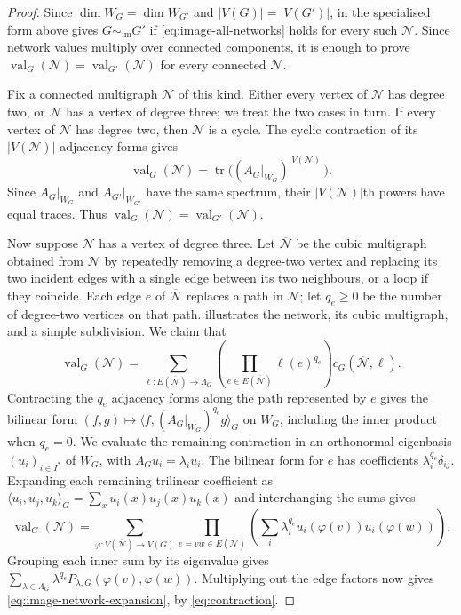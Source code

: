 \documentclass[11pt,a4paper]{article}
\theoremstyle{plain}
\theoremstyle{definition}
\DeclareMathOperator{\tr}{tr}
\DeclareMathOperator{\val}{val}
\begin{document}
\begin{proof}
Since $\dim W_G=\dim W_{G'}$ and $|V(G)|=|V(G')|$, \cite[Theorem~9]{Young2025} in the specialised form above
gives $G\sim_{\mathrm{im}}G'$ if \cref{eq:image-all-networks} holds
for every such $\mathcal N$.
Since network values multiply over connected components, it is enough
to prove $\val_G(\mathcal N)=\val_{G'}(\mathcal N)$ for every connected $\mathcal N$.

Fix a connected multigraph $\mathcal N$ of this kind. Either every vertex of
$\mathcal N$ has degree two, or $\mathcal N$ has a vertex of degree three; we treat the
two cases in turn.
If every vertex of $\mathcal N$ has degree two, then $\mathcal N$ is a cycle.
The cyclic contraction of its $|V(\mathcal N)|$ adjacency forms gives
\begin{equation}\label{eq:degree-two-trace}
 \val_G(\mathcal N)=\tr\bigl((A_G|_{W_G})^{|V(\mathcal N)|}\bigr).
\end{equation}
Since $A_G|_{W_G}$ and $A_{G'}|_{W_{G'}}$ have the same spectrum,
their $|V(\mathcal N)|$th powers have equal traces. Thus $\val_G(\mathcal N)=\val_{G'}(\mathcal N)$.

Now suppose $\mathcal N$ has a vertex of degree three.
Let $\overline{\mathcal N}$ be the cubic multigraph obtained from $\mathcal N$ by repeatedly
removing a degree-two vertex and replacing its two incident edges with
a single edge between its two neighbours, or a loop if they coincide.
Each edge $e$ of $\overline{\mathcal N}$ replaces a path in $\mathcal N$; let
$q_e\geq0$ be the number of degree-two vertices on that path.
 illustrates the network, its cubic multigraph,
and a simple subdivision.
We claim that
\begin{equation}\label{eq:image-network-expansion}
 \val_G(\mathcal N)=\sum_{\ell:E(\overline{\mathcal N})\to\Lambda_G}
 \left(\prod_{e\in E(\overline{\mathcal N})}\ell(e)^{q_e}\right)c_G(\overline{\mathcal N},\ell).
\end{equation}
Contracting the $q_e$ adjacency forms along the path represented by $e$
gives the bilinear form
$(f,g)\mapsto\langle f,(A_G|_{W_G})^{q_e}g\rangle_G$ on $W_G$,
including the inner product when $q_e=0$.
We evaluate the remaining contraction in an orthonormal eigenbasis
$(u_i)_{i\in I^*}$ of $W_G$, with $A_Gu_i=\lambda_i u_i$.
The bilinear form for $e$ has coefficients $\lambda_i^{q_e}\delta_{ij}$.
Expanding each remaining trilinear coefficient as
$\langle u_i,u_j,u_k\rangle_G=\sum_xu_i(x)u_j(x)u_k(x)$ and
interchanging the sums gives
\begin{equation}\label{eq:image-network-vertex-expansion}
 \val_G(\mathcal N)=\sum_{\varphi:V(\overline{\mathcal N})\to V(G)}
 \prod_{e=vw\in E(\overline{\mathcal N})}
 \left(\sum_i\lambda_i^{q_e}u_i(\varphi(v))u_i(\varphi(w))\right).
\end{equation}
Grouping each inner sum by its eigenvalue gives
$\sum_{\lambda\in\Lambda_G}\lambda^{q_e}P_{\lambda,G}(\varphi(v),\varphi(w))$.
Multiplying out the edge factors now gives
\cref{eq:image-network-expansion}, by \cref{eq:contraction}.


\end{proof}
\end{document}
